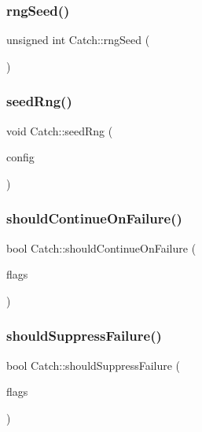 \mbox{\label{namespace_catch_acf5ea05e942d2d7fe79111e12754ed76}} 
\subsubsection{rng\+Seed()}
{\footnotesize\ttfamily unsigned int Catch\+::rng\+Seed (\begin{DoxyParamCaption}{ }\end{DoxyParamCaption})}

\mbox{\label{namespace_catch_a161400810eb0995394d6d8d3cae821ad}} 
\subsubsection{seed\+Rng()}
{\footnotesize\ttfamily void Catch\+::seed\+Rng (\begin{DoxyParamCaption}\item[{I\+Config const \&}]{config }\end{DoxyParamCaption})}

\mbox{\label{namespace_catch_a7f7480b15d74965459c844f0d393ed87}} 
\subsubsection{should\+Continue\+On\+Failure()}
{\footnotesize\ttfamily bool Catch\+::should\+Continue\+On\+Failure (\begin{DoxyParamCaption}\item[{int}]{flags }\end{DoxyParamCaption})\hspace{0.3cm}{\ttfamily [inline]}}

\mbox{\label{namespace_catch_ab91eb13081203d634fe48d3d2ab386d7}} 
\subsubsection{should\+Suppress\+Failure()}
{\footnotesize\ttfamily bool Catch\+::should\+Suppress\+Failure (\begin{DoxyParamCaption}\item[{int}]{flags }\end{DoxyParamCaption})\hspace{0.3cm}{\ttfamily [inline]}}

